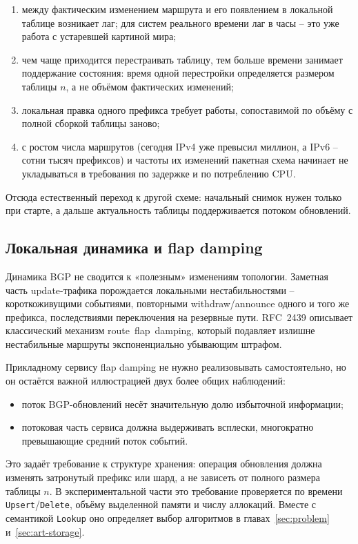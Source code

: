 \begin{enumerate}
\item между фактическим изменением маршрута и его появлением в
локальной таблице возникает лаг; для систем реального времени лаг в
часы -- это уже работа с устаревшей картиной мира;
\item чем чаще приходится перестраивать таблицу, тем больше времени
занимает поддержание состояния: время одной перестройки определяется размером
таблицы $n$, а не объёмом фактических изменений;
\item локальная правка одного префикса требует работы, сопоставимой
по объёму с полной сборкой таблицы заново;
\item с ростом числа маршрутов (сегодня IPv4 уже превысил миллион, а
IPv6 -- сотни тысяч префиксов) и частоты их изменений пакетная
схема начинает не укладываться в требования по задержке и по
потреблению CPU.
\end{enumerate}

Отсюда естественный переход к другой схеме: начальный снимок нужен
только при старте, а дальше актуальность таблицы поддерживается
потоком обновлений.

\subsection{Локальная динамика и flap damping}

Динамика BGP не сводится к «полезным» изменениям топологии. Заметная
часть update-трафика порождается локальными нестабильностями --
короткоживущими событиями, повторными withdraw/announce одного и того
же префикса, последствиями переключения на резервные пути. RFC~2439
\cite{rfc2439} описывает классический механизм route~flap~damping,
который подавляет излишне нестабильные маршруты экспоненциально
убывающим штрафом.

Прикладному сервису flap damping не нужно реализовывать
самостоятельно, но он остаётся важной иллюстрацией двух более общих
наблюдений:

\begin{itemize}
\item поток BGP-обновлений несёт значительную долю избыточной
информации;
\item потоковая часть сервиса должна выдерживать всплески,
многократно превышающие средний поток событий.
\end{itemize}

Это задаёт требование к структуре хранения: операция обновления должна
изменять затронутый префикс или шард, а не зависеть от полного размера
таблицы $n$. В экспериментальной части это требование проверяется по
времени \texttt{Upsert}/\texttt{Delete}, объёму выделенной памяти и числу
аллокаций. Вместе с семантикой \texttt{Lookup} оно определяет выбор
алгоритмов в главах~\ref{sec:problem} и~\ref{sec:art-storage}.

